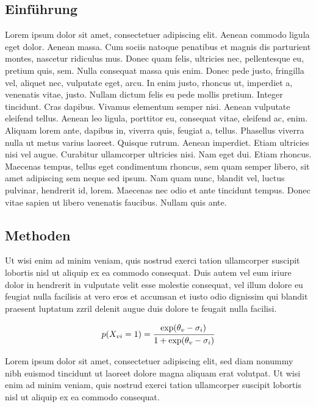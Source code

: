 \documentclass[a1paper, german, ngerman]{article}
\begin{document}
\begin{posterbox}
	\section*{Einführung}
	Lorem ipsum dolor sit amet, consectetuer adipiscing elit. Aenean commodo ligula eget dolor. Aenean massa. Cum sociis natoque penatibus et magnis dis parturient montes, nascetur ridiculus mus. Donec quam felis, ultricies nec, pellentesque eu, pretium quis, sem. Nulla consequat massa quis enim. Donec pede justo, fringilla vel, aliquet nec, vulputate eget, arcu. In enim justo, rhoncus ut, imperdiet a, venenatis vitae, justo. Nullam dictum felis eu pede mollis pretium. Integer tincidunt. Cras dapibus. Vivamus elementum semper nisi. Aenean vulputate eleifend tellus. Aenean leo ligula, porttitor eu, consequat vitae, eleifend ac, enim. Aliquam lorem ante, dapibus in, viverra quis, feugiat a, tellus. Phasellus viverra nulla ut metus varius laoreet. Quisque rutrum. Aenean imperdiet. Etiam ultricies nisi vel augue. Curabitur ullamcorper ultricies nisi. Nam eget dui. Etiam rhoncus. Maecenas tempus, tellus eget condimentum rhoncus, sem quam semper libero, sit amet adipiscing sem neque sed ipsum. Nam quam nunc, blandit vel, luctus pulvinar, hendrerit id, lorem. Maecenas nec odio et ante tincidunt tempus. Donec vitae sapien ut libero venenatis faucibus. Nullam quis ante.
\end{posterbox}

\vfill

\begin{posterbox}
	\section*{Methoden}
	Ut wisi enim ad minim veniam, quis nostrud exerci tation ullamcorper suscipit lobortis nisl ut aliquip ex ea commodo consequat. Duis autem vel eum iriure dolor in hendrerit in vulputate velit esse molestie consequat, vel illum dolore eu feugiat nulla facilisis at vero eros et accumsan et iusto odio dignissim qui blandit praesent luptatum zzril delenit augue duis dolore te feugait nulla facilisi.

	\begin{equation}
		p\!\left(X_{vi} = 1\right)
		= \frac{\exp\!\left(\theta_v - \sigma_i\right)\strut}
		{\strut 1 + \exp\!\left(\theta_v - \sigma_i\right)}
	\end{equation}

	Lorem ipsum dolor sit amet, consectetuer adipiscing elit, sed diam nonummy nibh euismod tincidunt ut laoreet dolore magna aliquam erat volutpat. Ut wisi enim ad minim veniam, quis nostrud exerci tation ullamcorper suscipit lobortis nisl ut aliquip ex ea commodo consequat.
\end{posterbox}
\end{document}
